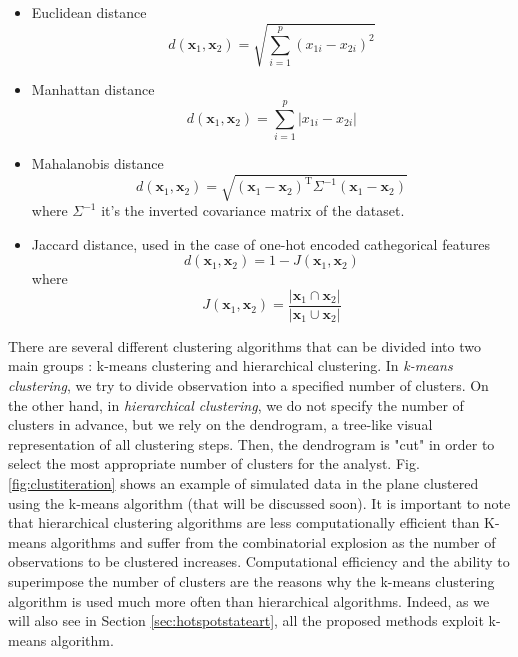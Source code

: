 \begin{itemize}
    \item Euclidean distance
\begin{equation}
    \label{eq:euclidean}
    d\left(\mathbf{x}_1,\mathbf{x}_2\right) = \sqrt{\sum_{i=1}^p\left(x_{1i}-x_{2i} \right)^2}
\end{equation}
\item Manhattan distance
\begin{equation}
    \label{eq:mandistance}
    d\left(\mathbf{x}_1,\mathbf{x}_2\right) = \sum_{i=1}^p\left|x_{1i}-x_{2i} \right|
\end{equation}
\item Mahalanobis distance
\begin{equation}
    \label{eq:mahadistance}
    d(\mathbf{x}_1, \mathbf{x}_2) = \sqrt{(\mathbf{x}_1 - \mathbf{x}_2)^\mathrm{T} \Sigma^{-1} (\mathbf{x}_1 - \mathbf{x}_2)}
\end{equation}
where $\Sigma^{-1}$ it's the inverted covariance matrix of the dataset.
\item Jaccard distance, used in the case of one-hot encoded cathegorical features
\begin{equation}
    \label{eq:jaccard}
    d\left(\mathbf{x}_1, \mathbf{x}_2\right) = 1 - J\left(\mathbf{x}_1, \mathbf{x}_2\right)
\end{equation}
where 
\begin{equation}
J\left(\mathbf{x}_1, \mathbf{x}_2\right) = \frac{\left|\mathbf{x}_1 \cap \mathbf{x}_2\right|}{\left|\mathbf{x}_1 \cup \mathbf{x}_2\right|}    
\end{equation}
\end{itemize}
There are several different clustering algorithms that can be divided into two main groups \cite{james_introduction_2021}: k-means clustering and hierarchical clustering. In \emph{k-means clustering}, we try to divide observation into a specified number of clusters. On the other hand, in \emph{hierarchical clustering}, we do not specify the number of clusters in advance, but we rely on the dendrogram, a tree-like visual representation of all clustering steps. Then, the dendrogram is "cut" in order to select the most appropriate number of clusters for the analyst. Fig. \ref{fig:clustiteration} shows an example of simulated data in the plane clustered using the k-means algorithm (that will be discussed soon). It is important to note that hierarchical clustering algorithms are less computationally efficient than K-means algorithms and suffer from the combinatorial explosion as the number of observations to be clustered increases. Computational efficiency and the ability to superimpose the number of clusters are the reasons why the k-means clustering algorithm is used much more often than hierarchical algorithms. Indeed, as we will also see in Section \ref{sec:hotspotstateart}, all the proposed methods exploit k-means algorithm.
